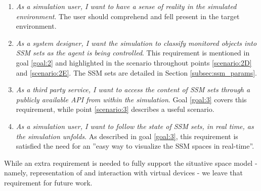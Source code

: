 \begin{enumerate}
	\item[\textlabel{5.}{us:5}] \emph{As a simulation user, I want to have a sense of reality in the simulated environment}. The user should comprehend and fell present in the target environment.

	\item[\textlabel{6.}{us:6}] \emph{As a system designer, I want the simulation to classify monitored objects into SSM sets as the agent is being controlled}. This requirement is mentioned in goal \ref{goal:2} and highlighted in the scenario throughout points \ref{scenario:2D} and \ref{scenario:2E}. The SSM sets are detailed in Section \ref{subsec:ssm_params}.

	\item[\textlabel{7.}{us:7}] \emph{As a third party service, I want to access the content of SSM sets through a publicly available API from within the simulation}. Goal \ref{goal:3} covers this requirement, while point \ref{scenario:3} describes a useful scenario.

	\item[\textlabel{8.}{us:8}] \emph{As a simulation user, I want to follow the state of SSM sets, in real time, as the simulation unfolds}. As described in goal \ref{goal:3}, this requirement is satisfied the need for an ''easy way to visualize the SSM spaces in real-time''.

\end{enumerate}

While an extra requirement is needed to fully support the situative space model - namely, representation of and interaction with virtual devices - we leave that requirement for future work.\\

